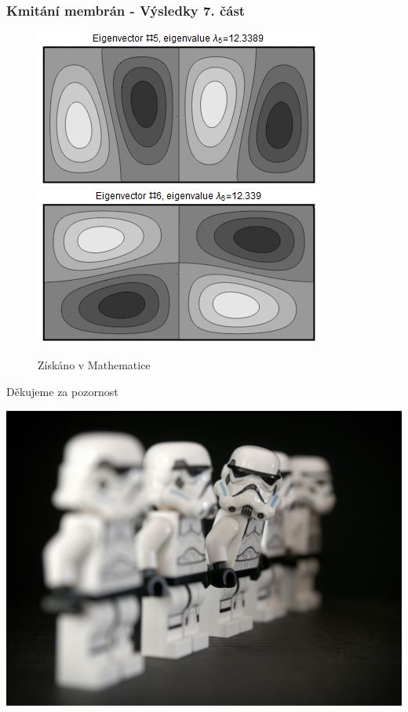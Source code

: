 \documentclass{beamer}
\begin{document}
\begin{frame}
\frametitle{Kmitání membrán - Výsledky 7. část}
\centering
\begin{figure}
\includegraphics[width=.6\linewidth]{rectangle-eigenvector-5.png}
\includegraphics[width=.6\linewidth]{rectangle-eigenvector-6.png}
\caption{Získáno v Mathematice}
\end{figure}
\end{frame}

\begin{frame}
\begin{center}
\begin{huge}
Děkujeme za pozornost
\end{huge}
  \centering
  \includegraphics[width=.8\linewidth]{stormtroop.jpg}
\end{center}

\end{frame}
\end{document}
